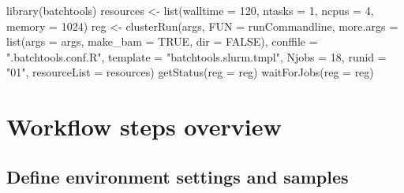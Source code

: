 \documentclass[14pt,]{article}
\newcommand{\hlnum}[1]{\textcolor[rgb]{0.816,0.125,0.439}{#1}}%
\newcommand{\hlstr}[1]{\textcolor[rgb]{0.251,0.627,0.251}{#1}}%
\newcommand{\hlstd}[1]{\textcolor[rgb]{0.251,0.251,0.251}{#1}}%
\newcommand{\hlkwc}[1]{\textcolor[rgb]{0.251,0.251,0.251}{#1}}%
\newcommand{\hlkwd}[1]{\textcolor[rgb]{0.878,0.439,0.125}{#1}}%
\newenvironment{Shaded}{\begin{myshaded}}{\end{myshaded}}
\newcommand{\KeywordTok}[1]{\hlkwd{#1}}
\newcommand{\DataTypeTok}[1]{\hlkwc{#1}}
\newcommand{\DecValTok}[1]{\hlnum{#1}}
\newcommand{\StringTok}[1]{\hlstr{#1}}
\newcommand{\OtherTok}[1]{{#1}}
\newcommand{\NormalTok}[1]{\hlstd{#1}}
\begin{document}
\begin{Shaded}
\begin{Highlighting}[]
\KeywordTok{library}\NormalTok{(batchtools)}
\NormalTok{resources <-}\StringTok{ }\KeywordTok{list}\NormalTok{(}\DataTypeTok{walltime =} \DecValTok{120}\NormalTok{, }\DataTypeTok{ntasks =} \DecValTok{1}\NormalTok{, }\DataTypeTok{ncpus =} \DecValTok{4}\NormalTok{, }\DataTypeTok{memory =} \DecValTok{1024}\NormalTok{)}
\NormalTok{reg <-}\StringTok{ }\KeywordTok{clusterRun}\NormalTok{(args, }\DataTypeTok{FUN =}\NormalTok{ runCommandline, }\DataTypeTok{more.args =} \KeywordTok{list}\NormalTok{(}\DataTypeTok{args =}\NormalTok{ args, }\DataTypeTok{make_bam =} \OtherTok{TRUE}\NormalTok{, }
    \DataTypeTok{dir =} \OtherTok{FALSE}\NormalTok{), }\DataTypeTok{conffile =} \StringTok{".batchtools.conf.R"}\NormalTok{, }\DataTypeTok{template =} \StringTok{"batchtools.slurm.tmpl"}\NormalTok{, }
    \DataTypeTok{Njobs =} \DecValTok{18}\NormalTok{, }\DataTypeTok{runid =} \StringTok{"01"}\NormalTok{, }\DataTypeTok{resourceList =}\NormalTok{ resources)}
\KeywordTok{getStatus}\NormalTok{(}\DataTypeTok{reg =}\NormalTok{ reg)}
\KeywordTok{waitForJobs}\NormalTok{(}\DataTypeTok{reg =}\NormalTok{ reg)}
\end{Highlighting}
\end{Shaded}

\hypertarget{workflow-steps-overview}{%
\section{Workflow steps overview}\label{workflow-steps-overview}}

\hypertarget{define-environment-settings-and-samples}{%
\subsection{Define environment settings and samples}\label{define-environment-settings-and-samples}}
\end{document}
